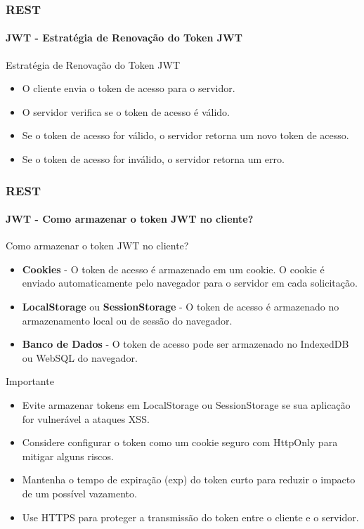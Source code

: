 \documentclass[
	9pt, %
	t, %
]{beamer}
\begin{document}
\begin{frame}
	\frametitle{REST}
	\framesubtitle{JWT - Estratégia de Renovação do Token JWT}

	\begin{block}{Estratégia de Renovação do Token JWT}
		\begin{itemize}
			\item O cliente envia o token de acesso para o servidor.
			\item O servidor verifica se o token de acesso é válido.
			\item Se o token de acesso for válido, o servidor retorna um novo token de acesso.
			\item Se o token de acesso for inválido, o servidor retorna um erro.
		\end{itemize}
	\end{block}

\end{frame}

\begin{frame}
	\frametitle{REST}
	\framesubtitle{JWT - Como armazenar o token JWT no cliente?}

	\begin{block}{Como armazenar o token JWT no cliente?}
		\begin{itemize}
			\item \textbf{Cookies} - O token de acesso é armazenado em um cookie. O cookie é enviado automaticamente pelo navegador para o servidor em cada solicitação.
			\item \textbf{LocalStorage} ou \textbf{SessionStorage} - O token de acesso é armazenado no armazenamento local ou de sessão do navegador.
			\item \textbf{Banco de Dados} - O token de acesso pode ser armazenado no IndexedDB ou WebSQL do navegador.
		\end{itemize}
	\end{block}

	\begin{block}{Importante}
		\begin{itemize}
			\item Evite armazenar tokens em LocalStorage ou SessionStorage se sua aplicação for
			      vulnerável a ataques XSS.
			\item Considere configurar o token como um cookie seguro com HttpOnly para mitigar
			      alguns riscos.
			\item Mantenha o tempo de expiração (exp) do token curto para reduzir o impacto de um
			      possível vazamento.
			\item Use HTTPS para proteger a transmissão do token entre o cliente e o servidor.
		\end{itemize}
	\end{block}

\end{frame}
\end{document}
